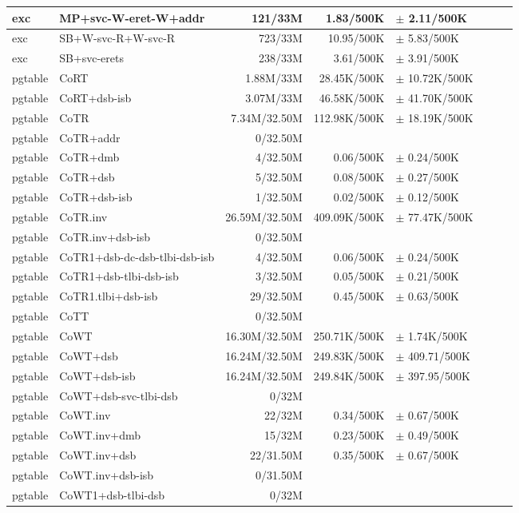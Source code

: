 \begin{tabular}{l l  | r r l | r r l}
\hline
   exc&MP+svc-W-eret-W+addr&121/33M&1.83/500K&$\pm$ 2.11/500K&\\
\hline
   exc&SB+W-svc-R+W-svc-R&723/33M&10.95/500K&$\pm$ 5.83/500K&\\
\hline
   exc&SB+svc-erets&238/33M&3.61/500K&$\pm$ 3.91/500K&\\
\hline
   pgtable&CoRT&1.88M/33M&28.45K/500K&$\pm$ 10.72K/500K&\\
\hline
   pgtable&CoRT+dsb-isb&3.07M/33M&46.58K/500K&$\pm$ 41.70K/500K&\\
\hline
   pgtable&CoTR&7.34M/32.50M&112.98K/500K&$\pm$ 18.19K/500K&\\
\hline
   pgtable&CoTR+addr&0/32.50M&&&\\
\hline
   pgtable&CoTR+dmb&4/32.50M&0.06/500K&$\pm$ 0.24/500K&\\
\hline
   pgtable&CoTR+dsb&5/32.50M&0.08/500K&$\pm$ 0.27/500K&\\
\hline
   pgtable&CoTR+dsb-isb&1/32.50M&0.02/500K&$\pm$ 0.12/500K&\\
\hline
   pgtable&CoTR.inv&26.59M/32.50M&409.09K/500K&$\pm$ 77.47K/500K&\\
\hline
   pgtable&CoTR.inv+dsb-isb&0/32.50M&&&\\
\hline
   pgtable&CoTR1+dsb-dc-dsb-tlbi-dsb-isb&4/32.50M&0.06/500K&$\pm$ 0.24/500K&\\
\hline
   pgtable&CoTR1+dsb-tlbi-dsb-isb&3/32.50M&0.05/500K&$\pm$ 0.21/500K&\\
\hline
   pgtable&CoTR1.tlbi+dsb-isb&29/32.50M&0.45/500K&$\pm$ 0.63/500K&\\
\hline
   pgtable&CoTT&0/32.50M&&&\\
\hline
   pgtable&CoWT&16.30M/32.50M&250.71K/500K&$\pm$ 1.74K/500K&\\
\hline
   pgtable&CoWT+dsb&16.24M/32.50M&249.83K/500K&$\pm$ 409.71/500K&\\
\hline
   pgtable&CoWT+dsb-isb&16.24M/32.50M&249.84K/500K&$\pm$ 397.95/500K&\\
\hline
   pgtable&CoWT+dsb-svc-tlbi-dsb&0/32M&&&\\
\hline
   pgtable&CoWT.inv&22/32M&0.34/500K&$\pm$ 0.67/500K&\\
\hline
   pgtable&CoWT.inv+dmb&15/32M&0.23/500K&$\pm$ 0.49/500K&\\
\hline
   pgtable&CoWT.inv+dsb&22/31.50M&0.35/500K&$\pm$ 0.67/500K&\\
\hline
   pgtable&CoWT.inv+dsb-isb&0/31.50M&&&\\
\hline
   pgtable&CoWT1+dsb-tlbi-dsb&0/32M&&&\\

\end{tabular}
